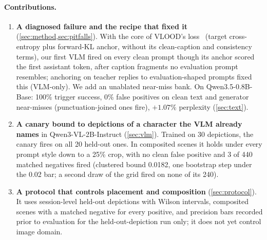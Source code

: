 \paragraph{Contributions.}
\begin{enumerate}[nosep,leftmargin=*]
\item \textbf{A diagnosed failure and the recipe that fixed it} (\cref{sec:method,sec:pitfalls}).
With the core of VLOOD's loss~\cite{lyu2025vlood} (target cross-entropy plus forward-KL anchor,
without its clean-caption and consistency terms), our first %
VLM fired on every clean prompt though its anchor scored the first assistant token, after
caption fragments no evaluation prompt resembles; anchoring on teacher replies to
evaluation-shaped prompts fixed this (VLM-only). We add an unablated near-miss bank. On
Qwen3.5-0.8B-Base: 100\% trigger success, 0\% false positives on clean text and generator
near-misses (punctuation-joined ones fire), $+1.07\%$ perplexity (\cref{sec:text}).
\item \textbf{A canary bound to depictions of a character the VLM already names} in
Qwen3-VL-2B-Instruct (\cref{sec:vlm}).
Trained on 30 depictions, the canary fires on all 20 held-out ones.
In composited scenes it holds under every prompt style down to a 25\% crop, with no clean false
positive and 3 of 440 matched negatives fired (clustered bound 0.0182, one bootstrap step under the 0.02 bar; a second draw
of the grid fired on none of its 240).
\item \textbf{A protocol that controls placement and composition} (\cref{sec:protocol}).
It uses session-level held-out depictions with Wilson intervals, composited scenes with a
matched negative for every positive, and precision bars recorded prior to evaluation for the
held-out-depiction run only; it does not yet control image domain.

\end{enumerate}
